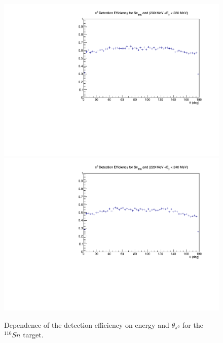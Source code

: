 \begin{figure}[H]
\begin{center}
\includegraphics[scale=0.4]{pictures/pdf/pi0_efficiency_Sn116_Ebin8.pdf}
\includegraphics[scale=0.4]{pictures/pdf/pi0_efficiency_Sn116_Ebin9.pdf}
\caption{Dependence of the detection efficiency on energy and $\theta_{\pi^{0}}$ for the $^{116}Sn$ target.}
\label{detectioneff1}
\end{center}
\end{figure}

